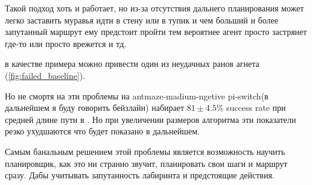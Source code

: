 Такой подход хоть и работает, но из-за отсутствия дальнего планирования может легко заставить муравья идти в стену или в тупик и чем больший и более запутанный маршрут ему предстоит пройти тем вероятнее агент просто застрянет где-то или просто врежется и тд. 

в качестве примера можно привести один из неудачных ранов  агнета (\ref{fig:failed_baseline}).

Но не смортя на эти проблемы на antmaze-madium-ngetive pi-switch(в дальнейшем я буду говорить бейзлайн) набирает $81\pm 4.5\%$ success rate при средней длине пути в . Но при увеличении размеров алгоритма эти показатели резко ухудшаются что будет показано в дальнейшем.

Самым банальным решением этой проблемы является возможность научить планировщик, как это ни странно звучит, планировать свои шаги и маршрут сразу. Дабы учитывать запутанность лабиринта и предстоящие действия.






